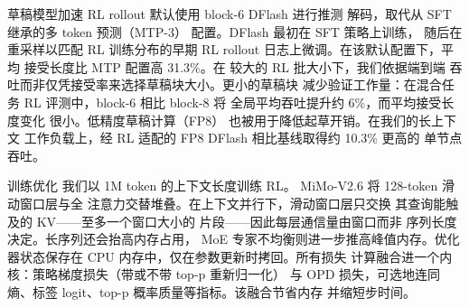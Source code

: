 草稿模型加速 RL rollout 默认使用 block-6 DFlash 进行推测
解码，取代从 SFT 继承的多 token 预测（MTP-3）
配置。DFlash 最初在 SFT 策略上训练，
随后在重采样以匹配
RL 训练分布的早期 RL rollout 日志上微调。在该默认配置下，平均
接受长度比 MTP 配置高 31.3\%。在
较大的 RL 批大小下，我们依据端到端
吞吐而非仅凭接受率来选择草稿块大小。更小的草稿块
减少验证工作量：在混合任务 RL 评测中，block-6 相比 block-8 将
全局平均吞吐提升约 6\%，而平均接受长度变化
很小。低精度草稿计算（FP8）
也被用于降低起草开销。在我们的长上下文
工作负载上，经 RL 适配的 FP8 DFlash 相比基线取得约 10.3\% 更高的
单节点吞吐。



训练优化 我们以 1M token 的上下文长度训练 RL。
MiMo-V2.6 将 128-token 滑动窗口层与全
注意力交替堆叠。在上下文并行下，滑动窗口层只交换
其查询能触及的 KV——至多一个窗口大小的
片段——因此每层通信量由窗口而非
序列长度决定。长序列还会抬高内存占用，
MoE 专家不均衡则进一步推高峰值内存。优化器状态保存在
CPU 内存中，仅在参数更新时拷回。所有损失
计算融合进一个内核：策略梯度损失（带或不带 top-p 重新归一化）
与 OPD 损失，可选地连同熵、标签 logit、top-p 概率质量等指标。该融合节省内存
并缩短步时间。
